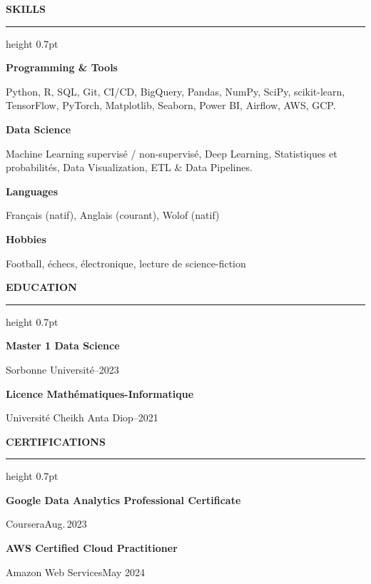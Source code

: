 \documentclass[11pt,a4paper]{article}
\newcommand{\sectiontitle}[1]{%
  \vspace{1em}\textbf{\uppercase{#1}}\par\vspace{.2em}
  \hrule height 0.7pt\relax\vspace{.8em}}
\newcommand{\edu}[3]{%
  \textbf{#1}\par
  {\small #2}\hfill\faCalendar\;#3\par\vspace{.8em}}
\begin{document}
\begin{minipage}[t]{0.47\textwidth}
\sectiontitle{Skills}

\textbf{Programming \& Tools}\par
Python, R, SQL, Git, CI/CD, BigQuery,\linebreak
Pandas, NumPy, SciPy, scikit-learn,\linebreak
TensorFlow, PyTorch, Matplotlib, Seaborn,\linebreak
Power BI, Airflow,\linebreak
AWS, GCP.

\vspace{.6em}
\textbf{Data Science}\par
Machine Learning supervisé / non-supervisé,\linebreak
Deep Learning, Statistiques et probabilités,\linebreak
Data Visualization, ETL \& Data Pipelines.

\vspace{.6em}
\textbf{Languages}\par
Français (natif), Anglais (courant), Wolof (natif)

\vspace{.6em}
\textbf{Hobbies}\par
Football, échecs, électronique, lecture de science-fiction
\end{minipage}
\hfill
\begin{minipage}[t]{0.47\textwidth}
\sectiontitle{Education}

\edu{Master 1 Data Science}{Sorbonne Université}{2022–2023}
\edu{Licence Mathématiques-Informatique}{Université Cheikh Anta Diop}{2018–2021}

\sectiontitle{Certifications}

\edu{Google Data Analytics Professional Certificate}{Coursera}{Aug.\,2023}
\edu{AWS Certified Cloud Practitioner}{Amazon Web Services}{May 2024}

\end{minipage}
\end{document}

